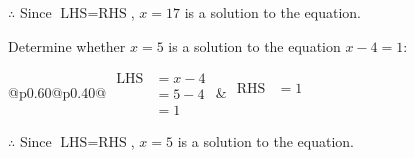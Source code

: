 \documentclass[12pt]{article}
\newcounter{minipagecount}
\begin{document}
\begin{multicols}{2}
\begin{minipage}[t]{0.40\textwidth}
    \noindent \(\therefore\) Since \(\text{LHS} = \text{RHS}\), \(x = 17\) is  a solution to the equation.

\end{minipage}

 \vspace*{16pt}
\noindent{(\theminipagecount)}\hspace{0.1mm} %
\begin{minipage}[t]{0.40\textwidth} %

    \noindent Determine whether \(x = 5\) is a solution to the equation \(x - 4 = 1\):
    \vspace{4pt}  %

    \noindent
    \renewcommand{\arraystretch}{1.3} %
    \begin{tabular}{@{}p{0.60\linewidth}@{}p{0.40\linewidth}@{}}
        \(\begin{aligned}
            \text{LHS} &= x - 4 \\
                    &= 5 - 4 \\
                    &= 1
        \end{aligned}\) &
        \(\begin{aligned}
            \text{RHS} &= 1\\
                    & \\
                    &
        \end{aligned}\)
    \end{tabular}
    \renewcommand{\arraystretch}{1.0} %
    \vspace{2pt}  %

    \noindent \(\therefore\) Since \(\text{LHS} = \text{RHS}\), \(x = 5\) is  a solution to the equation.

\end{minipage}

 \vspace*{16pt}
\columnbreak
\noindent{(\theminipagecount)}\hspace{0.1mm} %
\begin{minipage}[t]{0.40\textwidth} %


\end{minipage}
\end{multicols}
\end{document}

